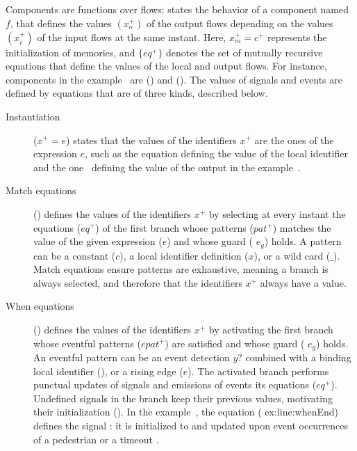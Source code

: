 Components are functions over flows:
states the behavior of a component named $f$, that defines the values $(x_o^+)$ of the output flows
depending on the values $(x_i^+)$ of the input flows at the same instant. Here, $x_m^+ = c^+$
represents the initialization of memories, and $\{eq^+\}$ denotes the set of mutually recursive
equations that define the values of the local and output flows.
%
For instance, components in the \aeb example~ are 
() and 
().
%
The values of signals and events are defined by equations that are of three kinds, described below.
\begin{description}
    \item[Instantiation] ($x^+ = e$) states that the values of the identifiers $x^+$ are the ones of
          the expression $e$, such as the equation  defining the value of the
          local identifier  and the one~ defining the value of the
          output  in the example~.

    \item[Match equations] ()
          defines the values of the identifiers $x^+$ by selecting at every instant the equations
          ($eq^+$) of the first branch whose patterns ($pat^+$) matches the value of the given
          expression ($e$) and whose guard ( $e_g$) holds.
          A pattern can be a constant ($c$), a local identifier definition ($x$), or a wild card
          ($\_$).
          Match equations ensure patterns are exhaustive, meaning a branch is always selected, and
          therefore that the identifiers $x^+$ always have a value.

    \item[When equations] () defines the values
          of the identifiers $x^+$ by activating the first branch whose eventful patterns ($epat^+$)
          are satisfied and whose guard ( $e_g$) holds.
          An eventful pattern can be an event detection $y?$ combined with a binding local
          identifier (), or a rising edge ($e$).
          The activated branch performs punctual updates of signals and emissions of events \via its
          equations ($eq^+$). Undefined signals in the branch keep their previous values, motivating
          their initialization ().
          In the example~, the  equation (%
          {ex:line:whenEnd}) defines the signal : it is initialized to  and
          updated upon event occurrences of a pedestrian  or a timeout .
\end{description}
